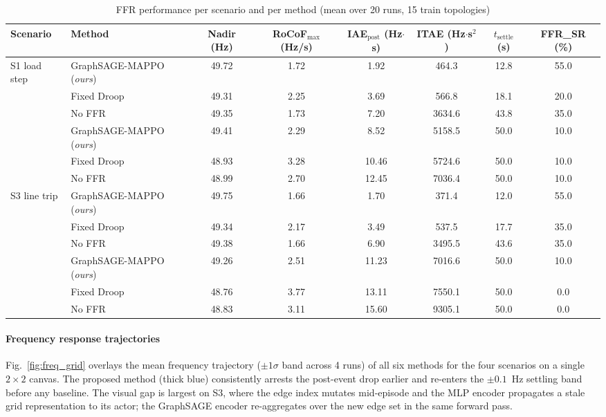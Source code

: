 \begin{table}[!t]
\caption{FFR performance per scenario and per method (mean over 20 runs, 15 train topologies)}
\label{tab:ffr_main}
\centering
\footnotesize
\begin{tabular}{llcccccc}
\toprule
Scenario & Method & Nadir (Hz) & RoCoF$_{\max}$ (Hz/s) & IAE$_{\text{post}}$ (Hz$\cdot$s) & ITAE (Hz$\cdot$s$^2$) & $t_{\text{settle}}$ (s) & FFR\_SR (\%) \\
\midrule
\multirow{6}{*}{S1 load step}
 & GraphSAGE-MAPPO (\emph{ours}) & 49.72 & 1.72 & 1.92 & 464.3 & 12.8 & 55.0 \\
  & Fixed Droop & 49.31 & 2.25 & 3.69 & 566.8 & 18.1 & 20.0 \\
  & No FFR & 49.35 & 1.73 & 7.20 & 3634.6 & 43.8 & 35.0 \\
\midrule
\multirow{6}{*}{S2 gen trip}
 & GraphSAGE-MAPPO (\emph{ours}) & 49.41 & 2.29 & 8.52 & 5158.5 & 50.0 & 10.0 \\
  & Fixed Droop & 48.93 & 3.28 & 10.46 & 5724.6 & 50.0 & 10.0 \\
  & No FFR & 48.99 & 2.70 & 12.45 & 7036.4 & 50.0 & 10.0 \\
\midrule
\multirow{6}{*}{S3 line trip}
 & GraphSAGE-MAPPO (\emph{ours}) & 49.75 & 1.66 & 1.70 & 371.4 & 12.0 & 55.0 \\
  & Fixed Droop & 49.34 & 2.17 & 3.49 & 537.5 & 17.7 & 35.0 \\
  & No FFR & 49.38 & 1.66 & 6.90 & 3495.5 & 43.6 & 35.0 \\
\midrule
\multirow{6}{*}{S4 gen trip severe}
 & GraphSAGE-MAPPO (\emph{ours}) & 49.26 & 2.51 & 11.23 & 7016.6 & 50.0 & 10.0 \\
  & Fixed Droop & 48.76 & 3.77 & 13.11 & 7550.1 & 50.0 & 0.0 \\
  & No FFR & 48.83 & 3.11 & 15.60 & 9305.1 & 50.0 & 0.0 \\
\bottomrule
\end{tabular}
\end{table}

\paragraph{Frequency response trajectories}
Fig.~\ref{fig:freq_grid} overlays the mean frequency trajectory ($\pm 1\sigma$
band across 4 runs) of all six methods for the four scenarios on a single
$2{\times}2$ canvas. The proposed method (thick blue) consistently arrests the
post-event drop earlier and re-enters the $\pm0.1$~Hz settling band before any
baseline. The visual gap is largest on S3, where the edge index mutates
mid-episode and the MLP encoder propagates a stale grid representation to
its actor; the GraphSAGE encoder re-aggregates over the new edge set in the
same forward pass.

